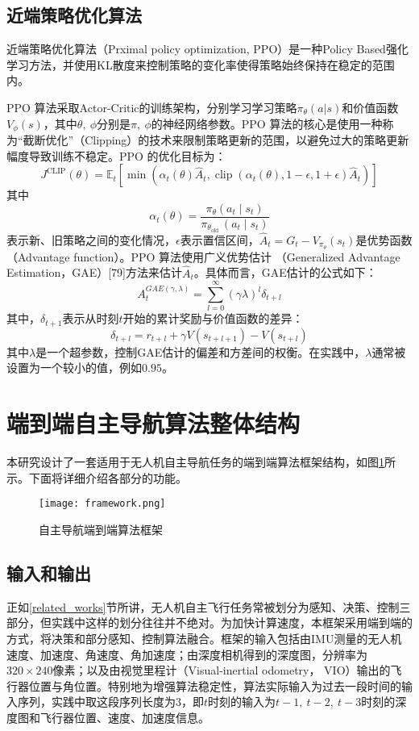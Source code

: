 \subsection{近端策略优化算法}
\label{PPO_alg}
近端策略优化算法\cite{schulman2017proximal}（Prximal policy optimization, PPO）是一种Policy Based强化学习方法，并使用KL散度来控制策略的变化率使得策略始终保持在稳定的范围内。

PPO 算法采取Actor-Critic的训练架构，分别学习学习策略$\pi_\theta(a|s)$和价值函数$V_\phi(s)$，其中$\theta,\ \phi$分别是$\pi,\ \phi$的神经网络参数。PPO 算法的核心是使用一种称为“截断优化”（Clipping）的技术来限制策略更新的范围，以避免过大的策略更新幅度导致训练不稳定。PPO 的优化目标为：
\[
  J^{\mathrm{CLIP}}(\theta)=\mathbb{E}_{t}\left[\min \left(\alpha_{t}(\theta) \hat{A}_{t}, \operatorname{clip}\left(\alpha_{t}(\theta), 1-\epsilon, 1+\epsilon\right) \hat{A}_{t}\right)\right]
\]
其中
\[
  \alpha_{t}(\theta)=\frac{\pi_{\theta}\left(a_{t} \mid s_{t}\right)}{\pi_{\theta_{\text {old }}}\left(a_{t} \mid s_{t}\right)}
\]
表示新、旧策略之间的变化情况，$\epsilon$表示置信区间，$\hat{A}_t = G_t-V_{\pi_\theta}(s_t)$是优势函数（Advantage function）。PPO 算法使用广义优势估计
（Generalized Advantage Estimation，GAE）[79]方法来估计$\hat{A}_t$。具体而言，GAE估计的公式如下：
\[
  A_{t}^{G A E(\gamma, \lambda)}=\sum_{l=0}^{\infty}(\gamma \lambda)^{l} \delta_{t+l}
\]
其中，$\delta_{t+1}$表示从时刻$t$开始的累计奖励与价值函数的差异：
\[
  \delta_{t+l}=r_{t+l}+\gamma V\left(s_{t+l+1}\right)-V\left(s_{t+l}\right)
\]
其中$\lambda$是一个超参数，控制GAE估计的偏差和方差间的权衡。在实践中，$\lambda$通常被设置为一个较小的值，例如$0.95$。

\section{端到端自主导航算法整体结构}
本研究设计了一套适用于无人机自主导航任务的端到端算法框架结构，如图\ref{fig_framework}所示。下面将详细介绍各部分的功能。
\begin{figure}
  \centering
  \texttt{[image: framework.png]}
  \caption{自主导航端到端算法框架}
  \label{fig_framework}
\end{figure}

\subsection{输入和输出}
正如\ref{related_works}节所讲，无人机自主飞行任务常被划分为感知、决策、控制三部分，但实践中这样的划分往往并不绝对。为加快计算速度，本框架采用端到端的方式，将决策和部分感知、控制算法融合。框架的输入包括由IMU测量的无人机速度、加速度、角速度、角加速度；由深度相机得到的深度图，分辨率为$320\times240$像素；以及由视觉里程计（Visual-inertial odometry， VIO）输出的飞行器位置与角位置。特别地为增强算法稳定性，算法实际输入为过去一段时间的输入序列，实践中取这段序列长度为3，即$t$时刻的输入为$t-1,\ t-2,\ t-3$时刻的深度图和飞行器位置、速度、加速度信息。

